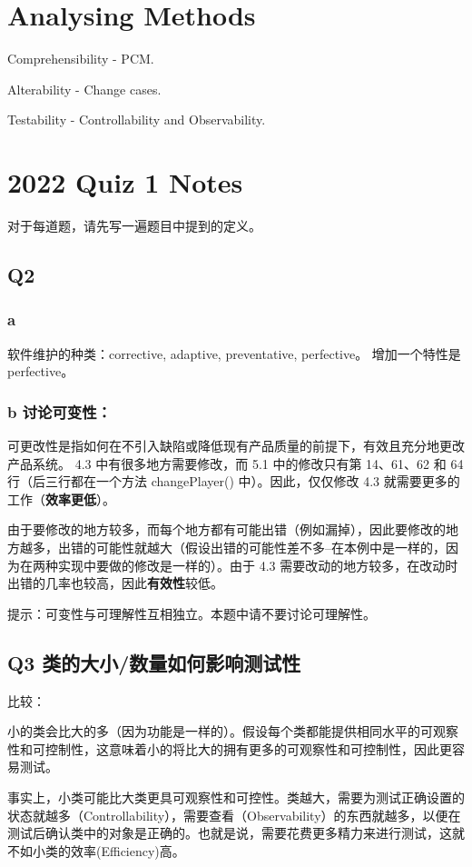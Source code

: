 \documentclass[]{ctexbook}
\begin{document}
\section{Analysing Methods}

Comprehensibility - PCM.

Alterability - Change cases.

Testability - Controllability and Observability.

\section{2022 Quiz 1 Notes}

对于每道题，请先写一遍题目中提到的定义。

\subsection{Q2}
\subsubsection{a}
软件维护的种类：corrective, adaptive, preventative, perfective。
增加一个特性是perfective。
\subsubsection{b 讨论可变性：}
可更改性是指如何在不引入缺陷或降低现有产品质量的前提下，有效且充分地更改产品系统。
4.3 中有很多地方需要修改，而 5.1 中的修改只有第 14、61、62 和 64 行（后三行都在一个方法 changePlayer() 中）。因此，仅仅修改 4.3 就需要更多的工作（\textbf{效率更低}）。

由于要修改的地方较多，而每个地方都有可能出错（例如漏掉），因此要修改的地方越多，出错的可能性就越大（假设出错的可能性差不多--在本例中是一样的，因为在两种实现中要做的修改是一样的）。由于 4.3 需要改动的地方较多，在改动时出错的几率也较高，因此\textbf{有效性}较低。

提示：可变性与可理解性互相独立。本题中请不要讨论可理解性。

\subsection{Q3 类的大小/数量如何影响测试性}
比较：

小的类会比大的多（因为功能是一样的）。假设每个类都能提供相同水平的可观察性和可控制性，这意味着小的将比大的拥有更多的可观察性和可控制性，因此更容易测试。

事实上，小类可能比大类更具可观察性和可控性。类越大，需要为测试正确设置的状态就越多（Controllability），需要查看（Observability）的东西就越多，以便在测试后确认类中的对象是正确的。也就是说，需要花费更多精力来进行测试，这就不如小类的效率(Efficiency)高。
\end{document}
